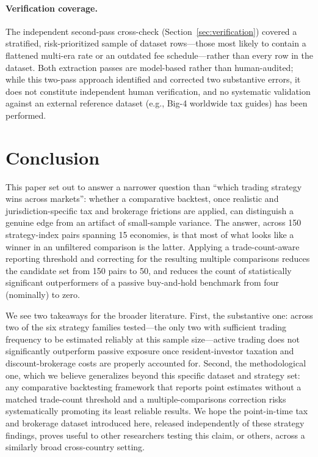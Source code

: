 \documentclass[11pt]{article}
\begin{document}
\paragraph{Verification coverage.} The independent second-pass cross-check (Section~\ref{sec:verification}) covered a stratified, risk-prioritized sample of dataset rows---those most likely to contain a flattened multi-era rate or an outdated fee schedule---rather than every row in the dataset. Both extraction passes are model-based rather than human-audited; while this two-pass approach identified and corrected two substantive errors, it does not constitute independent human verification, and no systematic validation against an external reference dataset (e.g., Big-4 worldwide tax guides) has been performed.

\section{Conclusion}

This paper set out to answer a narrower question than ``which trading strategy wins across markets'': whether a comparative backtest, once realistic and jurisdiction-specific tax and brokerage frictions are applied, can distinguish a genuine edge from an artifact of small-sample variance. The answer, across 150 strategy-index pairs spanning 15 economies, is that most of what looks like a winner in an unfiltered comparison is the latter. Applying a trade-count-aware reporting threshold and correcting for the resulting multiple comparisons reduces the candidate set from 150 pairs to 50, and reduces the count of statistically significant outperformers of a passive buy-and-hold benchmark from four (nominally) to zero.

We see two takeaways for the broader literature. First, the substantive one: across two of the six strategy families tested---the only two with sufficient trading frequency to be estimated reliably at this sample size---active trading does not significantly outperform passive exposure once resident-investor taxation and discount-brokerage costs are properly accounted for. Second, the methodological one, which we believe generalizes beyond this specific dataset and strategy set: any comparative backtesting framework that reports point estimates without a matched trade-count threshold and a multiple-comparisons correction risks systematically promoting its least reliable results. We hope the point-in-time tax and brokerage dataset introduced here, released independently of these strategy findings, proves useful to other researchers testing this claim, or others, across a similarly broad cross-country setting.
\end{document}
